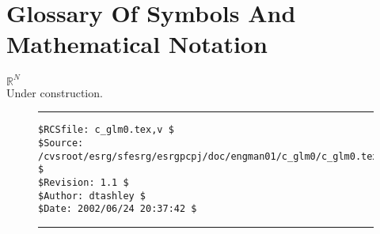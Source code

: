 %
\chapter*{Glossary Of Symbols And Mathematical Notation}
\label{cglm0}

\begin{glossaryenum}
\item {\boldmath{}$\mathbb{R}^N$} \\
      Under construction.
\end{glossaryenum}


\noindent\begin{figure}[!b]
\noindent\rule[-0.25in]{\textwidth}{1pt}
\begin{tiny}
\begin{verbatim}
$RCSfile: c_glm0.tex,v $
$Source: /cvsroot/esrg/sfesrg/esrgpcpj/doc/engman01/c_glm0/c_glm0.tex,v $
$Revision: 1.1 $
$Author: dtashley $
$Date: 2002/06/24 20:37:42 $
\end{verbatim}
\end{tiny}
\noindent\rule[0.25in]{\textwidth}{1pt}
\end{figure}
%
